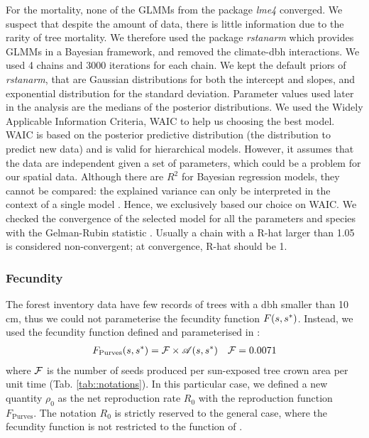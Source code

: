For the mortality, none of the GLMMs from the package \textit{lme4} converged. We suspect that despite the amount of data, there is little information due to the rarity of tree mortality. We therefore used the package \textit{rstanarm}
\citep{rstanarm} which provides GLMMs in a Bayesian framework, and removed the climate-dbh interactions. We used 4 chains and 3000 iterations for each chain. We kept the
default priors of \textit{rstanarm}, that are Gaussian distributions for both
the intercept and slopes, and exponential distribution for the standard deviation. Parameter values used later in the analysis are the medians of the
posterior distributions. We used the Widely Applicable
Information Criteria, WAIC \citep[and reference therein]{Hooten2015} to help
us choosing the best model. WAIC is based on the posterior predictive distribution (the distribution to predict new data) and is valid for hierarchical models. However, it assumes that the data are independent given a set of parameters, which could be a problem for our spatial data. Although there are $ R^2 $ for Bayesian regression models, they cannot
be compared: the explained variance can only be interpreted in the context of
a single model \citep{Gelman2018}. Hence, we exclusively based our choice on
WAIC. We checked the convergence of the selected model for all the parameters and species with the Gelman-Rubin statistic \citep[R-hat diagnostic]{Gelman1992}. Usually a chain with a R-hat larger than 1.05 is considered non-convergent; at convergence, R-hat should be 1.

\subsubsection{Fecundity}

The forest inventory data have few records of trees with a dbh smaller than 10 cm, thus we could not parameterise the fecundity function $ F(s, {s}^{*}) $. Instead, we used the fecundity function defined and parameterised in \citet{Purves2008}:
\begin{align} \label{eq::fecundity_fct}
	F_{\text{Purves}}(s, {s}^{*}) = \mathcal{F} \times \mathscr{A}(s, {s}^{*}) && \mathcal{F} = 0.0071
\end{align}
where $ \mathcal{F} $ is the number of seeds produced per sun-exposed tree crown area per unit time
(Tab. \ref{tab::notations}). In this particular case, we defined a new quantity
$ \rho_0 $ as the net reproduction rate $ R_0 $ with the reproduction function
$ F_{\text{Purves}} $. The notation $ R_0 $ is strictly reserved to the
general case, where the fecundity function is not restricted to the function
of \citeauthor{Purves2008}.

